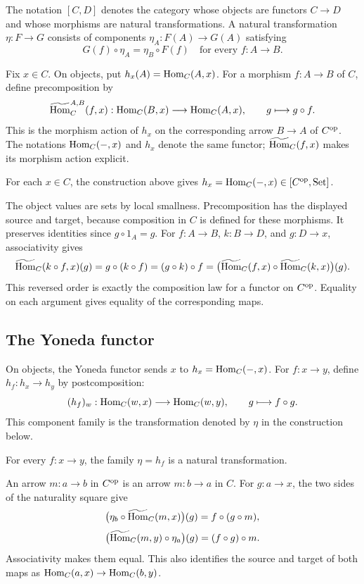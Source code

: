 \begin{definition}
The notation $[C,D]$ denotes the category whose objects are functors
$C\to D$ and whose morphisms are natural transformations. A natural
transformation $\eta:F\to G$ consists of components
$\eta_A:F(A)\to G(A)$ satisfying
\[
G(f)\circ\eta_A=\eta_B\circ F(f)
\quad\text{for every }f:A\to B.
\]
\end{definition}

\begin{definition}
Fix $x\in C$. On objects, put $h_x(A)={\textrm{Hom}}_C(A,x)$. For a morphism
$f:A\to B$ of $C$, define precomposition by
\[
{\widetilde{{\textrm{Hom}}}\textrm{}}_C^{A,B}(f,x):{\textrm{Hom}}_C(B,x)\longrightarrow{\textrm{Hom}}_C(A,x),
\qquad g\longmapsto g\circ f.
\]
This is the morphism action of $h_x$ on the corresponding arrow
$B\to A$ of $C^{\textrm{op}}$. The notations ${\textrm{Hom}}_C(-,x)$ and $h_x$ denote the
same functor; ${\widetilde{{\textrm{Hom}}}\textrm{}}_C(f,x)$ makes its morphism action explicit.
\end{definition}

\begin{lemma}
For each $x\in C$, the construction above gives
$h_x={\textrm{Hom}}_C(-,x)\in[C^{\textrm{op}},{\textrm{Set}}]$.
\end{lemma}
\Proof
The object values are sets by local smallness. Precomposition has the
displayed source and target, because composition in $C$ is defined for
these morphisms. It preserves identities since $g\circ1_A=g$.
For $f:A\to B$, $k:B\to D$, and $g:D\to x$, associativity gives
\[
{\widetilde{{\textrm{Hom}}}\textrm{}}_C(k\circ f,x)(g)
 =g\circ(k\circ f)
 =(g\circ k)\circ f
 =\bigl({\widetilde{{\textrm{Hom}}}\textrm{}}_C(f,x)\circ{\widetilde{{\textrm{Hom}}}\textrm{}}_C(k,x)\bigr)(g).
\]
This reversed order is exactly the composition law for a functor on
$C^{\textrm{op}}$. Equality on each argument gives equality of the corresponding
maps.
\Done

\subsection{The Yoneda functor}
\begin{definition}
On objects, the Yoneda functor sends $x$ to $h_x={\textrm{Hom}}_C(-,x)$.
For $f:x\to y$, define $h_f:h_x\to h_y$ by postcomposition:
\[
(h_f)_w:{\textrm{Hom}}_C(w,x)\longrightarrow{\textrm{Hom}}_C(w,y),
\qquad g\longmapsto f\circ g.
\]
This component family is the transformation denoted by $\eta$ in the
construction below.
\end{definition}

\begin{lemma}
For every $f:x\to y$, the family $\eta=h_f$ is a natural transformation.
\end{lemma}
\Proof
An arrow $m:a\to b$ in $C^{\textrm{op}}$ is an arrow $m:b\to a$ in $C$.
For $g:a\to x$, the two sides of the naturality square give
\[
\bigl(\eta_b\circ{\widetilde{{\textrm{Hom}}}\textrm{}}_C(m,x)\bigr)(g)=f\circ(g\circ m),
\]
\[
\bigl({\widetilde{{\textrm{Hom}}}\textrm{}}_C(m,y)\circ\eta_a\bigr)(g)=(f\circ g)\circ m.
\]
Associativity makes them equal. This also identifies the source and
target of both maps as ${\textrm{Hom}}_C(a,x)\to{\textrm{Hom}}_C(b,y)$.
\Done


